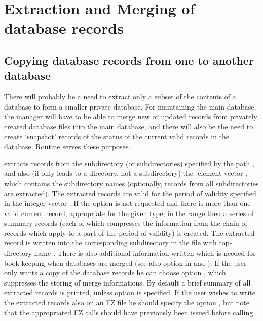 \chapter{Extraction and Merging of database records}

\section{Copying database records from one to another database}

There will probably be a need to extract only a subset of the contents
of a database to form a smaller private database. For maintaining the
main database, the manager will have to be able to merge new or updated
records from privately created database files into the main database,
and there will also be the need to create `snapshot' records of the
status of the current valid records in the database.
Routine  serves these purposes.

 extracts records from the subdirectory (or subdirectories)
specified by the path  , and also (if  only leads to a
directory, not a subdirectory) the -element  vector
, which contains the subdirectory names (optionally, records
from all subdirectories are extracted). The extracted records are
valid for the period of validity specified in the integer vector
. If the  option is not requested and there is more than
one valid current record, appropriate for the given type, in the range
then a series of summary records (each of which compresses the
information from the chain of records which apply to a part of
the period of validity) is created. The extracted record is written into
the corresponding subdirectory in the file with top-directory name
.
There is also additional information written which is needed for
book-keeping when databases are merged
(see also option  in  and ).
If the user only wants a copy of the database records he can
choose option , which suppresses the storing of merge informations.
By default a brief summary of all extracted records is printed, unless
option  is specified. If the user wishes to write the
extracted records also on an FZ file he should specify the option ,
but note that the appropriated FZ calls should have previously been
issued before calling .

